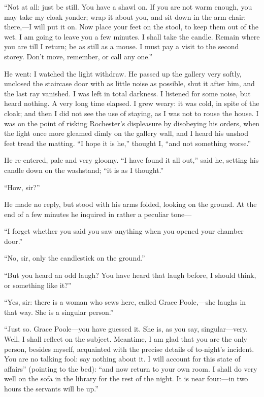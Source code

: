 \enquote{Not at all: just be still. You have a shawl on. If you are
not warm enough, you may take my cloak yonder; wrap it about you, and
sit down in the arm-chair: there,---I will put it on. Now place your
feet on the stool, to keep them out of the wet. I am going to leave you
a few minutes. I shall take the candle. Remain where you are till I
return; be as still as a mouse. I must pay a visit to the second
storey. Don't move, remember, or call any one.}

He went: I watched the light withdraw. He passed up the gallery very
softly, unclosed the staircase door with as little noise as possible,
shut it after him, and the last ray vanished. I was left in total
darkness. I listened for some noise, but heard nothing. A very long
time elapsed. I grew weary: it was cold, in spite of the cloak; and
then I did not see the use of staying, as I was not to rouse the house. 
I was on the point of risking \Mr{}  Rochester's displeasure by disobeying
his orders, when the light once more gleamed dimly on the gallery wall,
and I heard his unshod feet tread the matting. \enquote{I hope it is
he,} thought I, \enquote{and not something worse.}

He re-entered, pale and very gloomy. \enquote{I have found it all out,}
said he, setting his candle down on the washstand; \enquote{it is as I
thought.}

\enquote{How, sir?}

He made no reply, but stood with his arms folded, looking on the
ground. At the end of a few minutes he inquired in rather a peculiar
tone---

\enquote{I forget whether you said you saw anything when you opened your
chamber door.}

\enquote{No, sir, only the candlestick on the ground.}

\enquote{But you heard an odd laugh? You have heard that laugh before,
I should think, or something like it?}

\enquote{Yes, sir: there is a woman who sews here, called Grace
Poole,---she laughs in that way. She is a singular person.}

\enquote{Just so. Grace Poole---you have guessed it. She is, as you
say, singular---very. Well, I shall reflect on the subject. Meantime,
I am glad that you are the only person, besides myself, acquainted with
the precise details of to-night's incident. You are no talking fool:
say nothing about it. I will account for this state of affairs}
(pointing to the bed): \enquote{and now return to your own room. I
shall do very well on the sofa in the library for the rest of the
night. It is near four:---in two hours the servants will be up.}

